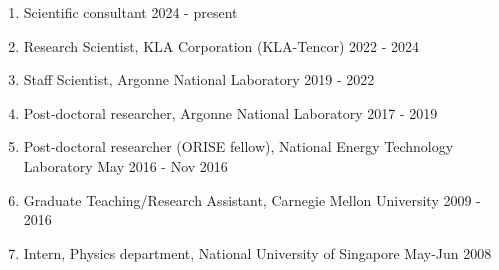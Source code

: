 \begin{enumerate}
    \item Scientific consultant \hfill 2024 - present
    \item Research Scientist, KLA Corporation (KLA-Tencor) \hfill 2022 - 2024
    \item Staff Scientist, Argonne National Laboratory \hfill 2019 - 2022
    \item Post-doctoral researcher, Argonne National Laboratory \hfill 2017 - 2019
    \item Post-doctoral researcher (ORISE fellow), National Energy Technology Laboratory  \hfill May 2016 - Nov 2016
    \item Graduate Teaching/Research Assistant, Carnegie Mellon University \hfill 2009 - 2016
    \item Intern, Physics department, National University of Singapore \hfill May-Jun 2008 
\end{enumerate}